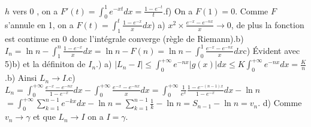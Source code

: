 $h$ vers 0 , on a $\displaystyle{F'(t)=\int_0^1
e^{-xt}dx=\frac{1-e^{-t}}{t}}$.\newline f) On a $F(1)=0$.\newline
Comme $F$ s'annule en 1, on a $\displaystyle{F(t)=\int_1^t
\frac{1-e^{-x}}{x}dx}$) a) $\displaystyle{x^2\times
\frac{e^{-x}-e^{-nx}}{x}\rightarrow 0}$, de plus la fonction est
continue en 0 donc l'int\'egrale converge (r\`egle de
Riemann).\newline b) $\displaystyle{I_n=\ln n-\int_1^n
\frac{1-e^{-x}}{x}dx=\ln n-F(n)=\ln n
-\int_0^1\frac{e^{-x}-e^{-nx}}{x}dx}$\newline c) \'Evident avec
5)b) et la d\'efiniton de $I_n$.) a)
$\displaystyle{|L_n-I|\leq \int_0^{+\infty} e^{-nx}|g(x)|dx\leq
K\int_0^{+\infty} e^{-nx}dx=\frac{K}{n}}$.\newline b) Ainsi
$L_n\rightarrow I$.\newline c) $\displaystyle{L_n=\int_0^{+\infty}
\frac{e^{-x}-e^{-nx}}{1-e^{-x}}dx-\int_0^{+\infty}
\frac{e^{-x}-e^{-nx}}{x}dx=\int_0^{+\infty}
\frac{1}{e^x}\frac{1-e^{-(n-1)x}}{1-e^{-x}}dx-\ln n}$\newline
$\displaystyle{=\int_0^{+\infty} \sum_{k=1}^{n-1} e^{-kx}dx-\ln
n=\sum_{k=1}^{n-1}\frac{1}{k}-\ln n=S_{n-1}-\ln n=v_n}$.\newline
d) Comme $v_n\rightarrow \gamma$ et que $L_n\rightarrow I$ on a
$I=\gamma$.



